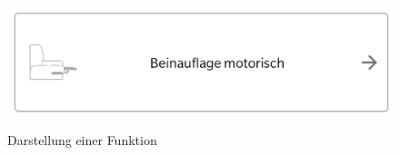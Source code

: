 \begin{figure}[!htb]
    \centering
    \begin{minipage}[t]{0.4\textwidth}
        \caption{Darstellung einer Funktion}
        \includegraphics[width=1\textwidth]{img/Screenshot_Knowledge_Function.jpg}\\
        \label{fig:screenshot_knowledge_functions}
    \end{minipage}
\end{figure}

